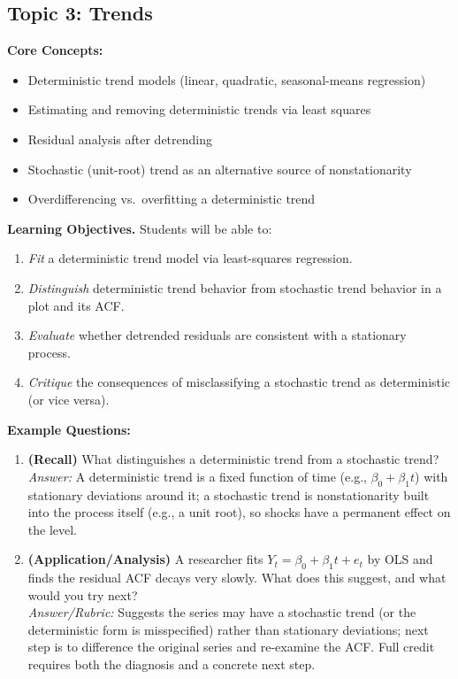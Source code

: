 \documentclass[11pt]{article}
\begin{document}
\subsection{Topic 3: Trends}

\textbf{Core Concepts:}
\begin{itemize}
\item Deterministic trend models (linear, quadratic, seasonal-means regression)
\item Estimating and removing deterministic trends via least squares
\item Residual analysis after detrending
\item Stochastic (unit-root) trend as an alternative source of nonstationarity
\item Overdifferencing vs.\ overfitting a deterministic trend
\end{itemize}

\textbf{Learning Objectives.} Students will be able to:
\begin{enumerate}
\item \emph{Fit} a deterministic trend model via least-squares regression.
\item \emph{Distinguish} deterministic trend behavior from stochastic trend behavior in a plot and its ACF.
\item \emph{Evaluate} whether detrended residuals are consistent with a stationary process.
\item \emph{Critique} the consequences of misclassifying a stochastic trend as deterministic (or vice versa).
\end{enumerate}

\textbf{Example Questions:}
\begin{enumerate}
\item \textbf{(Recall)} What distinguishes a deterministic trend from a stochastic trend? \\
\emph{Answer:} A deterministic trend is a fixed function of time (e.g., $\beta_0+\beta_1 t$) with stationary deviations around it; a stochastic trend is nonstationarity built into the process itself (e.g., a unit root), so shocks have a permanent effect on the level.
\item \textbf{(Application/Analysis)} A researcher fits $Y_t=\beta_0+\beta_1 t + e_t$ by OLS and finds the residual ACF decays very slowly. What does this suggest, and what would you try next? \\
\emph{Answer/Rubric:} Suggests the series may have a stochastic trend (or the deterministic form is misspecified) rather than stationary deviations; next step is to difference the original series and re-examine the ACF. Full credit requires both the diagnosis and a concrete next step.
\end{enumerate}
\end{document}
